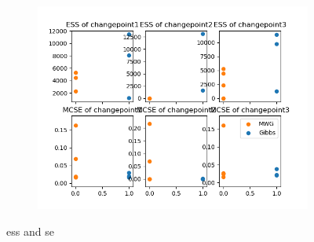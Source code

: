\begin{figure}[H]
\begin{subfigure}{.3\textwidth}
    	\includegraphics[width=\linewidth]{../../plots/ess_se_M4_N60_NMCMC3_seed0_diffind2.png}
	\end{subfigure}
	\caption{ess and se}
\end{figure}